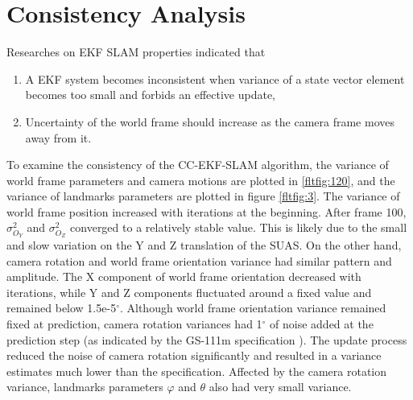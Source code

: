 \section{Consistency Analysis}\label{sec:flight-consistency}
Researches on EKF SLAM properties indicated that 
\begin{enumerate}
  \item A EKF system becomes inconsistent when variance of a state
  vector element becomes too small and forbids an effective update,
  \item Uncertainty of the world frame should increase as the
  camera frame moves away from it.
\end{enumerate}

To examine the consistency of the CC-EKF-SLAM algorithm, the variance
of world frame parameters and camera motions are plotted in
\ref{fltfig:120}, and the variance of landmarks parameters are plotted
in figure \ref{fltfig:3}. The variance of world frame position
increased with iterations at the beginning. After frame 100,
$\sigma^2_{O_Y}$ and $\sigma^2_{O_Z}$ converged to a relatively stable
value. This is likely due to the small and slow variation on the Y and
Z translation of the SUAS. On the other hand, camera rotation and
world frame orientation variance had similar pattern and amplitude.
The X component of world frame orientation decreased with iterations,
while Y and Z components fluctuated around a fixed value and remained
below 1.5e-5$^\circ$. Although world frame orientation variance
remained fixed at prediction, camera rotation variances had 1$^\circ$
of noise added at the prediction step (as indicated by the GS-111m
specification \cite{_athena_????}). The update process reduced the
noise of camera rotation significantly and resulted in a variance
estimates much lower than the specification. Affected by the camera
rotation variance, landmarks parameters $\varphi$ and $\theta$ also
had very small variance.


